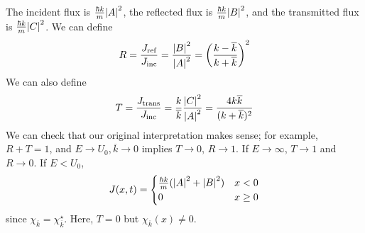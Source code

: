 The incident flux is \( \frac{\hbar k}{m} \abs{A}^2 \), the reflected flux is \( \frac{\hbar k}{m} \abs{B}^2 \), and the transmitted flux is \( \frac{\hbar k}{m} \abs{C}^2 \).
We can define
\[ R = \frac{J_{\text{ref}}}{J_{\text{inc}}} = \frac{\abs{B}^2}{\abs{A}^2} = \qty(\frac{k - \overline k}{k + \overline k})^2 \]
We can also define
\[ T = \frac{J_{\text{trans}}}{J_{\text{inc}}} = \frac{k}{\overline k} \frac{\abs{C}^2}{\abs{A}^2} = \frac{4k \overline k}{(k + \overline k)^2} \]
We can check that our original interpretation makes sense; for example, \( R + T = 1 \), and \( E \to U_0, \overline k \to 0 \) implies \( T \to 0 \), \( R \to 1 \).
If \( E \to \infty \), \( T \to 1 \) and \( R \to 0 \).
If \( E < U_0 \),
\[ J(x,t) =
	\begin{cases}
		\frac{\hbar k}{m} (\abs{A}^2 + \abs{B}^2) & x < 0 \\
		0 & x \geq 0
	\end{cases}
\]
since \( \chi_{\overline k} = \chi_{\overline k}^\star \).
Here, \( T = 0 \) but \( \chi_{\overline k}(x) \neq 0 \).
